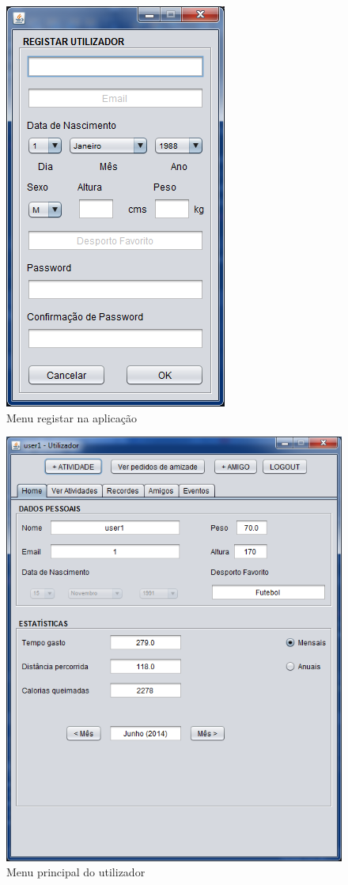 \documentclass[12pt,notitlepage]{article}
\begin{document}
\begin{figure}[h]
\centering
\includegraphics[scale=0.8]{registar.png}
\caption{Menu registar na aplicação}
\end{figure}



\begin{figure}[h]
\centering
\includegraphics[scale=1]{home.png}
\caption{Menu principal do utilizador}
\end{figure}
\end{document}
